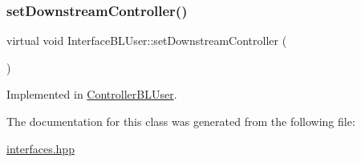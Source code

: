 \subsubsection{\texorpdfstring{set\+Downstream\+Controller()}{setDownstreamController()}}
{\footnotesize\ttfamily virtual void Interface\+B\+L\+User\+::set\+Downstream\+Controller (\begin{DoxyParamCaption}\item[{\hyperlink{class_stub_p_r}{Stub\+PR} $\ast$}]{ }\end{DoxyParamCaption})\hspace{0.3cm}{\ttfamily [pure virtual]}}



Implemented in \hyperlink{class_controller_b_l_user_a4594159d854a4bbb2aef17e7ef688821}{Controller\+B\+L\+User}.



The documentation for this class was generated from the following file\+:\begin{DoxyCompactItemize}
\item 
\hyperlink{interfaces_8hpp}{interfaces.\+hpp}\end{DoxyCompactItemize}
